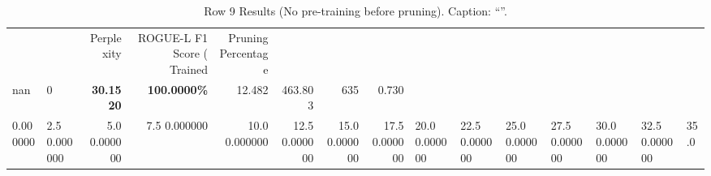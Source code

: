 \begin{table}
\caption{Row 9 Results (No pre-training before pruning). \ifshowcaption{}Caption: ``''.\fi}
\label{tab:evaluation-pipeline-9-untrained}
\begin{tabular}{llrrrrrr}
 &  & Perplexity & ROGUE-L F1 Score (%
Trained & Pruning Percentage &  &  &  &  &  &  \\
nan & 0 & \bfseries 30.1520 & \bfseries 100.0000\% & 12.482 & 463.803 & 635 & 0.730 \\
0.000000 & 2.5%
0.000000 & 5.0%
0.000000 & 7.5%
0.000000 & 10.0%
0.000000 & 12.5%
0.000000 & 15.0%
0.000000 & 17.5%
0.000000 & 20.0%
0.000000 & 22.5%
0.000000 & 25.0%
0.000000 & 27.5%
0.000000 & 30.0%
0.000000 & 32.5%
0.000000 & 35.0%

\end{tabular}
\end{table}
